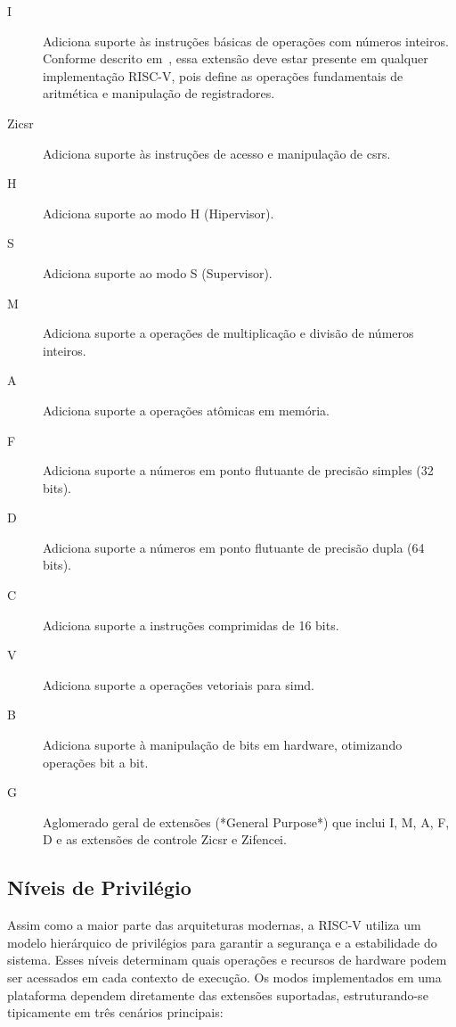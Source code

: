 \begin{description}

\item[I]
Adiciona suporte às instruções básicas de operações com números inteiros. Conforme descrito em~\cite{isa-riscv}, essa extensão deve estar
presente em qualquer implementação RISC-V, pois define as operações fundamentais de aritmética e manipulação de registradores.

\item[Zicsr]
Adiciona suporte às instruções de acesso e manipulação de \glspl{csr}.

\item[H]
Adiciona suporte ao modo H (Hipervisor).

\item[S]
Adiciona suporte ao modo S (Supervisor).

\item[M]
Adiciona suporte a operações de multiplicação e divisão de números inteiros.

\item[A]
Adiciona suporte a operações atômicas em memória.

\item[F]
Adiciona suporte a números em ponto flutuante de precisão simples (32 bits).

\item[D]
Adiciona suporte a números em ponto flutuante de precisão dupla (64 bits).

\item[C]
Adiciona suporte a instruções comprimidas de 16 bits.

\item[V]
Adiciona suporte a operações vetoriais para \gls{simd}.

\item[B]
Adiciona suporte à manipulação de bits em hardware, otimizando operações bit a bit.

\item[G]
Aglomerado geral de extensões (*General Purpose*) que inclui I, M, A, F, D e as extensões de controle Zicsr e Zifencei.

\end{description}

\subsection{Níveis de Privilégio}

Assim como a maior parte das arquiteturas modernas, a RISC-V utiliza um modelo hierárquico de privilégios para garantir a segurança e a estabilidade do sistema.
Esses níveis determinam quais operações e recursos de hardware podem ser acessados em cada contexto de execução. Os modos implementados em uma plataforma dependem
diretamente das extensões suportadas, estruturando-se tipicamente em três cenários principais:

